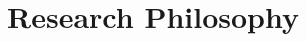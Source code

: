 \documentclass[11pt]{article}
\begin{document}
\title{Research Philosophy}
\date{}
\maketitle

\end{document}
